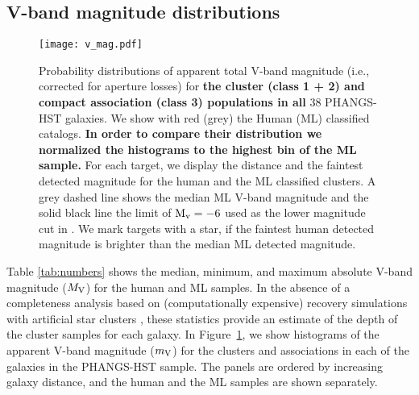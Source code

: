 \documentclass[linenumbers]{aastex63}
\begin{document}
\subsection{V-band magnitude distributions}\label{ssect:v_mag}
%
\begin{figure*} 
\texttt{[image: v\_mag.pdf]}
 \caption{Probability distributions of apparent total V-band magnitude (i.e., corrected for aperture losses) for \textbf{the cluster (class 1 + 2) and compact association (class 3) populations in all}  38 PHANGS-HST galaxies. We show with red (grey) the Human (ML) classified catalogs. 
 \textbf{In order to compare their distribution we normalized the histograms to the highest bin of the ML sample.}
 For each target, we display the distance and the faintest detected magnitude for the human and the ML classified clusters. A grey dashed line shows the median ML V-band magnitude and the solid black line the limit of ${\rm M_v=-6}$ used as the lower magnitude cut in \citet{adamo_legacy_2017}. We mark targets with a star, if the faintest human detected magnitude is brighter than the median ML detected magnitude.}
 \label{fig:v_mag_panel}
\end{figure*}
%
Table \ref{tab:numbers} shows the median, minimum, and maximum absolute V-band
magnitude ($M_{\rm V}$) for the human and ML samples.  In the absence of a completeness analysis based on (computationally expensive) recovery simulations with artificial star clusters \citep[e.g.][]{mayya08, adamo_legacy_2017, messa_young_2018, linden_massive_2021, linden_star_2022, tang_cluster_2023}, these statistics provide an estimate of the depth of the cluster samples for each galaxy. In Figure~\ref{fig:v_mag_panel}, we show histograms of the apparent V-band magnitude ($m_{\rm V}$) for the clusters and associations in each of the galaxies in the PHANGS-HST sample. The panels are ordered by increasing galaxy distance, and the human and the ML samples are shown separately.
\end{document}

